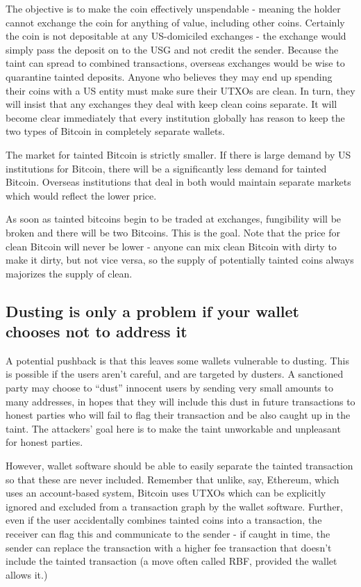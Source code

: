 \documentclass{article}%
\begin{document}
The objective is to make the coin effectively unspendable - meaning the holder
cannot exchange the coin for anything of value, including other coins.
 Certainly the coin is not depositable at any US-domiciled exchanges - the exchange
would simply pass the deposit on to the USG and not credit the sender.
 Because the taint can spread to combined transactions, overseas exchanges
would be wise to quarantine tainted deposits.  Anyone who believes they may end up spending their coins with a US entity must make sure their UTXOs are clean.  In turn, they will insist that any
exchanges they deal with keep clean coins separate.  It will become clear immediately
that every institution globally has reason to keep the two types of Bitcoin in
completely separate wallets.

The market for tainted Bitcoin is strictly smaller. If there is large demand
by US institutions for Bitcoin, there will be a significantly less demand for tainted Bitcoin. Overseas
institutions that deal in both would maintain separate markets which would
reflect the lower price.

As soon as tainted bitcoins begin to be traded at exchanges, fungibility will
be broken and there will be two Bitcoins.  This is the goal.  Note that the
price for clean Bitcoin will never be lower - anyone can mix clean Bitcoin
with dirty to make it dirty, but not vice versa, so the supply of potentially tainted coins always majorizes the supply of clean.

\subsection{Dusting is only a problem if your wallet chooses not to address it}

A potential pushback is that this leaves some wallets vulnerable to dusting.  This is
possible if the users aren't careful, and are targeted by dusters. A sanctioned party may choose to ``dust'' innocent users by
sending very small amounts to many addresses, in hopes that they will
include this dust in future transactions to honest parties who will fail to flag
their transaction and be also caught up in the taint. The attackers' goal
here is to make the taint unworkable and unpleasant for honest
parties.

However, wallet software should be able to easily separate the tainted
transaction so that these are never included.  Remember that unlike, say,
Ethereum, which uses an account-based system, Bitcoin uses UTXOs which
can be explicitly ignored and excluded from a transaction graph by the wallet
software.  Further, even if the user accidentally combines tainted coins into a
transaction, the receiver can flag this and communicate to the sender - if caught in time,
the sender can replace the transaction with a higher fee transaction that
doesn't include the tainted transaction (a move often called RBF, provided the wallet allows it.)
\end{document}
